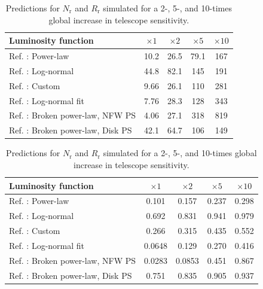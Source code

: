 \documentclass{C://Aliases//Dropbox-MIT//Latex_Templates//personal}
\begin{document}
\begin{table}
    \centering
    \begin{subtable}[h]{0.9\textwidth}
        \centering
        \begin{tabular}{|l|c|c|c|c|}
            \hline
            Luminosity function & $\times 1$ & $\times 2$ & $\times 5$ & $\times 10$ \\ \hline
            Ref. \cite{Zhong:2019ycb}: Power-law & 10.2 & 26.5 & 79.1 & 167 \\
            Ref. \cite{osti_1305131}: Log-normal & 44.8 & 82.1 & 145 & 191 \\
            Ref. \cite{Ploeg:2020jeh}: Custom  & 9.66 & 26.1 & 110 & 281 \\
            Ref. \cite{Ploeg:2020jeh}: Log-normal fit  & 7.76 & 28.3 & 128 & 343 \\
            Ref. \cite{Lee:2015fea}: Broken power-law, NFW PS & 4.06 & 27.1 & 318 & 819 \\
            Ref. \cite{Lee:2015fea}: Broken power-law, Disk PS & 42.1 & 64.7 & 106 & 149 \\ \hline
        \end{tabular}
        \caption{$N_r$ values for different sensitivities.}
    \end{subtable}

    \vspace{1em}

    \begin{subtable}[h]{0.9\textwidth}
        \centering
        \begin{tabular}{|l|c|c|c|c|}
            \hline
            Luminosity function & $\times 1$ & $\times 2$ & $\times 5$ & $\times 10$ \\ \hline
            Ref. \cite{Zhong:2019ycb}: Power-law & 0.101 & 0.157 & 0.237 & 0.298 \\
            Ref. \cite{osti_1305131}: Log-normal & 0.692 & 0.831 & 0.941 & 0.979 \\
            Ref. \cite{Ploeg:2020jeh}: Custom  & 0.266 & 0.315 & 0.435 & 0.552 \\
            Ref. \cite{Ploeg:2020jeh}: Log-normal fit  & 0.0648 & 0.129 & 0.270 & 0.416 \\
            Ref. \cite{Lee:2015fea}: Broken power-law, NFW PS & 0.0283 & 0.0853 & 0.451 & 0.867 \\
            Ref. \cite{Lee:2015fea}: Broken power-law, Disk PS & 0.751 & 0.835 & 0.905 & 0.937 \\ \hline
        \end{tabular}
        \caption{$R_\text{r}$ values for different sensitivities.}
     \end{subtable}
     \caption{Predictions for $N_\text{r}$ and $R_\text{r}$ simulated for a 2-, 5-, and 10-times global increase in telescope sensitivity.}
\end{table}
\end{document}
